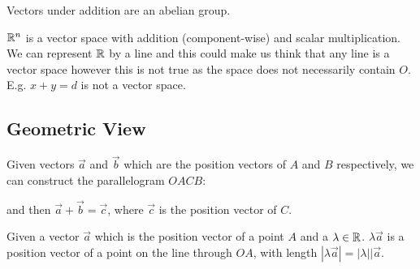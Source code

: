 \documentclass[../main.tex]{subfiles}
\begin{document}
\begin{remark}
  Vectors under addition are an abelian group.
\end{remark}
\begin{remark}[Warning]
  $\mathbb{R}^{n}$ is a vector space with addition (component-wise) and scalar multiplication.
  We can represent $\mathbb{R}$ by a line and this could make us think that any line is a vector space however this is not true as the space does not necessarily contain $O$.
  E.g. $x + y = d$ is not a vector space.
\end{remark}

\subsection{Geometric View}
Given vectors $\vec{a}$ and $\vec{b}$ which are the position vectors of $A$ and $B$ respectively, we can construct the parallelogram $OACB$:
\begin{center}
\end{center}

and then $\vec{a} + \vec{b} = \vec{c}$, where $\vec{c}$ is the position vector of $C$.

Given a vector $\vec{a}$ which is the position vector of a point $A$ and a $\lambda \in \mathbb{R}$.
$\lambda \vec{a}$ is a position vector of a point on the line through $OA$, with length $|\lambda \vec{a}| = |\lambda||\vec{a}$.
\end{document}

